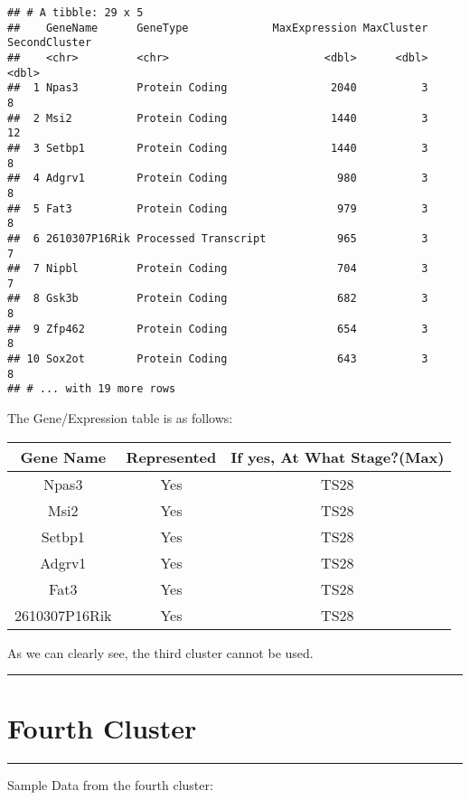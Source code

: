 \documentclass[
]{book}
\begin{document}
\begin{verbatim}
## # A tibble: 29 x 5
##    GeneName      GeneType             MaxExpression MaxCluster SecondCluster
##    <chr>         <chr>                        <dbl>      <dbl>         <dbl>
##  1 Npas3         Protein Coding                2040          3             8
##  2 Msi2          Protein Coding                1440          3            12
##  3 Setbp1        Protein Coding                1440          3             8
##  4 Adgrv1        Protein Coding                 980          3             8
##  5 Fat3          Protein Coding                 979          3             8
##  6 2610307P16Rik Processed Transcript           965          3             7
##  7 Nipbl         Protein Coding                 704          3             7
##  8 Gsk3b         Protein Coding                 682          3             8
##  9 Zfp462        Protein Coding                 654          3             8
## 10 Sox2ot        Protein Coding                 643          3             8
## # ... with 19 more rows
\end{verbatim}

The Gene/Expression table is as follows:

\begin{longtable}[]{@{}ccc@{}}
\toprule
Gene Name & Represented & If yes, At What Stage?(Max)\tabularnewline
\midrule
\endhead
Npas3 & Yes & TS28\tabularnewline
Msi2 & Yes & TS28\tabularnewline
Setbp1 & Yes & TS28\tabularnewline
Adgrv1 & Yes & TS28\tabularnewline
Fat3 & Yes & TS28\tabularnewline
2610307P16Rik & Yes & TS28\tabularnewline
\bottomrule
\end{longtable}

As we can clearly see, the third cluster cannot be used.

\begin{center}\rule{0.5\linewidth}{0.5pt}\end{center}

\hypertarget{fourth-cluster}{%
\chapter{Fourth Cluster}\label{fourth-cluster}}

\begin{center}\rule{0.5\linewidth}{0.5pt}\end{center}

Sample Data from the fourth cluster:
\end{document}
